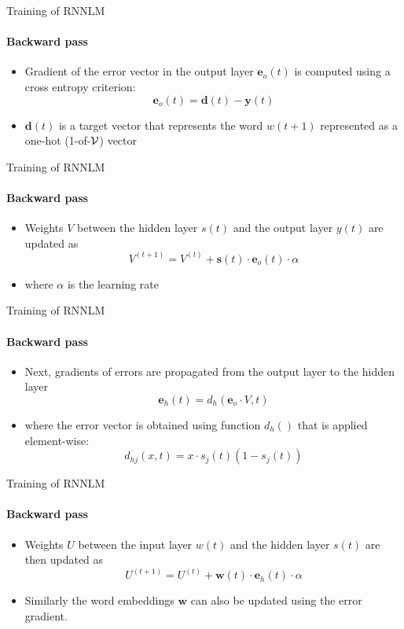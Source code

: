 \begin{frame}{Training of RNNLM}
\framesubtitle{Backward pass}
\begin{itemize}[<+->]
	\item Gradient of the error vector in the output layer $\mathbf{e}_o(t)$ is computed using a cross entropy criterion:
	\[ \mathbf{e}_o(t) = \mathbf{d}(t) - \mathbf{y}(t) \]
	\item $\mathbf{d}(t)$ is a target vector that represents the word $w(t+1)$ represented as a one-hot (1-of-${\cal V}$) vector
\end{itemize}
\end{frame}

\begin{frame}{Training of RNNLM}
\framesubtitle{Backward pass}
\begin{itemize}[<+->]
	\item Weights $V$ between the hidden layer $s(t)$ and the output layer $y(t)$ are updated as
	\[ V^{(t+1)} = V^{(t)} + \mathbf{s}(t) \cdot \mathbf{e}_o(t) \cdot \alpha \]
	\item where $\alpha$ is the learning rate
\end{itemize}
\end{frame}

\begin{frame}{Training of RNNLM}
\framesubtitle{Backward pass}
\begin{itemize}[<+->]
	\item Next, gradients of errors are propagated from the output layer to the hidden layer
	\[ \mathbf{e}_h(t) = d_h(\mathbf{e}_o \cdot V, t) \]
	\item where the error vector is obtained using function $d_h()$ that is applied element-wise:
	\[ d_{hj}(x,t) = x \cdot s_j(t) (1 - s_j(t))\]
\end{itemize}
\end{frame}

\begin{frame}{Training of RNNLM}
\framesubtitle{Backward pass}
\begin{itemize}[<+->]
	\item Weights $U$ between the input layer $w(t)$ and the hidden layer $s(t)$ are then updated as
	\[ U^{(t+1)} = U^{(t)} + \mathbf{w}(t) \cdot \mathbf{e}_h(t) \cdot \alpha \]
	\item Similarly the word embeddings $\mathbf{w}$ can also be updated using the error gradient.
\end{itemize}
\end{frame}

